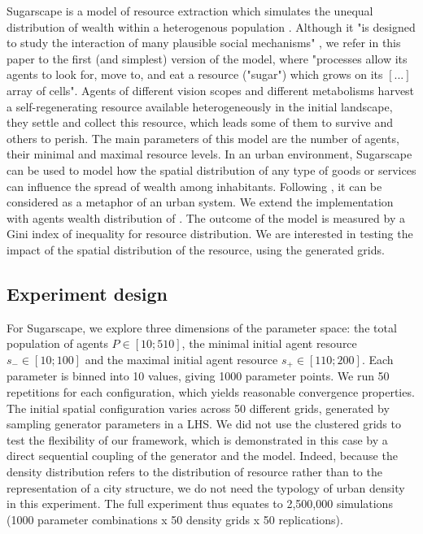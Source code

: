 \documentclass{JASSS}
\begin{document}
Sugarscape is a model of resource extraction which simulates the unequal distribution of wealth within a heterogenous population \cite{EpsteinAxtell1996}. Although it "is designed to study the interaction of many plausible social mechanisms" \cite[p.125]{Axtelletal1996}, we refer in this paper to the first (and simplest) version of the model, where "processes allow its agents to look for, move to, and eat a resource ("sugar") which grows on its $[...]$ array of cells". Agents of different vision scopes and different metabolisms harvest a self-regenerating resource available heterogeneously in the initial landscape, they settle and collect this resource, which leads some of them to survive and others to perish. The main parameters of this model are the number of agents, their minimal and maximal resource levels. In an urban environment, Sugarscape can be used to model how the spatial distribution of any type of goods or services can influence the spread of wealth among inhabitants. Following \cite{batty2005agents}, it can be considered as a metaphor of an urban system. We extend the implementation with agents wealth distribution of \cite{li2009netlogo}. The outcome of the model is measured by a Gini index of inequality for resource distribution. We are interested in testing the impact of the spatial distribution of the resource, using the generated grids.


\subsection{Experiment design}
For Sugarscape, we explore three dimensions of the parameter space: the total population of agents $P\in \left[10;510\right]$, the minimal initial agent resource $s_{-}\in \left[10;100\right]$ and the maximal initial agent resource $s_{+}\in \left[110;200\right]$. Each parameter is binned into 10 values, giving 1000 parameter points. We run 50 repetitions for each configuration, which yields reasonable convergence properties. The initial spatial configuration varies across 50 different grids, generated by sampling generator parameters in a LHS. We did not use the clustered grids to test the flexibility of our framework, which is demonstrated in this case by a direct sequential coupling of the generator and the model. Indeed, because the density distribution refers to the distribution of resource rather than to the representation of a city structure, we do not need the typology of urban density in this experiment. The full experiment thus equates to 2,500,000 simulations (1000 parameter combinations x 50 density grids x 50 replications). 
\end{document}
